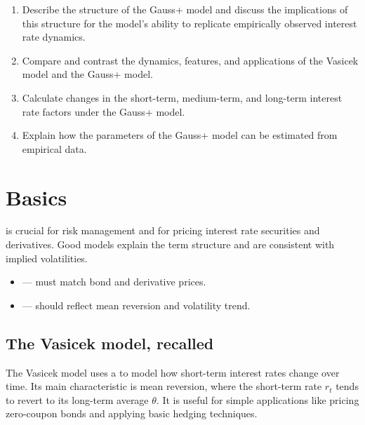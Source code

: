 
\begin{mrkeybox}[title={Learning objectives in this reading}]
\small
\begin{enumerate}[label=\textbf{\alph*.},leftmargin=1.7em]
\item Describe the structure of the Gauss+ model and discuss the implications of this structure
      for the model's ability to replicate empirically observed interest rate dynamics.
\item Compare and contrast the dynamics, features, and applications of the Vasicek model and the
      Gauss+ model.
\item Calculate changes in the short-term, medium-term, and long-term interest rate factors
      under the Gauss+ model.
\item Explain how the parameters of the Gauss+ model can be estimated from empirical data.
\end{enumerate}
\end{mrkeybox}

\section{Basics}

 is crucial for risk management and for pricing interest rate
securities and derivatives. Good models explain the term structure and are consistent with
implied volatilities.

\begin{mrkeybox}[title={Objectives of a good model}]
\begin{itemize}
\item {} --- must match bond and derivative prices.
\item {} --- should reflect mean reversion and volatility trend.
\end{itemize}
\end{mrkeybox}

\subsection{The Vasicek model, recalled}
The Vasicek model uses a  to model how short-term interest rates change over
time. Its main characteristic is mean reversion, where the short-term rate $r_t$ tends to revert
to its long-term average $\theta$. It is useful for simple applications like pricing zero-coupon
bonds and applying basic hedging techniques.

